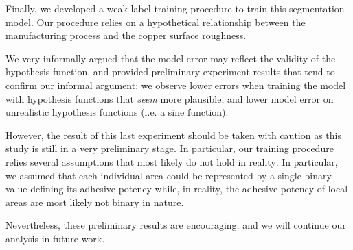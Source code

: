 \documentclass[10pt,twocolumn,letterpaper]{article}
\begin{document}
Finally, we developed a weak label training procedure to train this segmentation model.
Our procedure relies on a hypothetical relationship between the manufacturing process and the
copper surface roughness.

We very informally argued that the model error may reflect the validity of the hypothesis function,
and provided preliminary experiment results that tend to confirm our informal argument:
we observe lower errors when training the model with hypothesis functions that \textit{seem} more plausible,
and lower model error on unrealistic hypothesis functions (i.e. a sine function).

However, the result of this last experiment should be taken with caution as this study is still in a very preliminary stage.
In particular, our training procedure relies several assumptions that most likely do not hold in reality: 
In particular, we assumed that each individual area could be represented by a single binary value defining its adhesive potency
while, in reality, the adhesive potency of local areas are most likely not binary in nature.

Nevertheless, these preliminary results are encouraging, and we will continue our analysis in future work.

{\small
	
	
}
\end{document}
